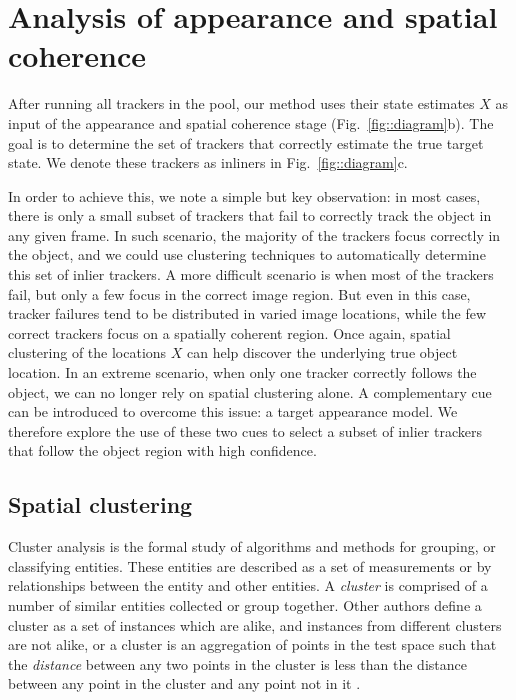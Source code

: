 \section{Analysis of appearance and spatial coherence}
After running all trackers in the pool, our method uses their state estimates
$X$ as input of the appearance and spatial coherence stage
(Fig.~\ref{fig::diagram}b). The goal is to determine the set of
trackers that correctly estimate the true target state. We denote these trackers
as inliners in Fig.~\ref{fig::diagram}c.

In order to achieve this, we note a simple but key observation: in most cases,
there is only a small subset of trackers that fail to correctly track the
object in any given frame.
In such scenario, the majority of the trackers focus correctly in the object,
and we could use \gls{clustering} techniques to automatically determine this set
of inlier trackers.
A more difficult scenario is when most of the trackers fail, but only a few
focus in the correct image region. But even in this case, tracker failures
tend to be distributed in varied image locations, while the few correct
trackers focus on a spatially coherent region. Once again, spatial clustering
of the locations $X$ can help discover the underlying true object location.
In an extreme scenario, when only one tracker correctly follows the object,
we can no longer rely on spatial clustering alone.
A complementary cue can be introduced to overcome this issue: a target
appearance model. We therefore explore the use of these two cues
to select a subset of inlier trackers that follow the object region with
high confidence.


\subsection{Spatial clustering}

Cluster analysis is the formal study of algorithms and methods for grouping, or
classifying entities. These entities are described as a set of measurements or by
relationships between the entity and other entities. A \textit{cluster} is
comprised of a number of similar entities collected or group together. Other
authors define a cluster as a set of instances which are alike, and instances from
different clusters are not alike, or a cluster is an aggregation of points in
the test space such that the \textit{distance} between any two points in the
cluster is less than the distance between any point in the cluster and any point
not in it \cite{Jain88}.

